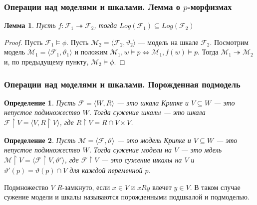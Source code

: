 \documentclass[pdf,utf8,russian,aspectratio=169]{beamer}
\newtheorem{defin}{Определение}
\newtheorem{lem}{Лемма}
\begin{document}
\begin{frame}
  \frametitle{Операции над моделями и шкалами. Лемма о $p$-морфизмах}

  \begin{lem}
    Пусть $f: \mathcal{F}_1 \twoheadrightarrow \mathcal{F}_2$, тогда $Log(\mathcal{F}_1) \subseteq Log(\mathcal{F}_2)$
  \end{lem}

  \begin{proof}
    Пусть $\mathcal{F}_1 \models \phi$. Пусть $\mathcal{M}_2 = \langle \mathcal{F}_2, \vartheta_2 \rangle$ --- модель на шкале
    $\mathcal{F}_2$. Посмотрим модель $\mathcal{M}_1 = \langle \mathcal{F}_1, \vartheta_1 \rangle$ и положим $\mathcal{M}_1, w
    \models p \Leftrightarrow \mathcal{M}_1, f(w) \models p$. Тогда $\mathcal{M}_1 \twoheadrightarrow \mathcal{M}_2$ и, по
    предыдущему пункту, $\mathcal{M}_2 \models \phi$.
  \end{proof}

\end{frame}

\begin{frame}
  \frametitle{Операции над моделями и шкалами. Порожденная подмодель}

  \begin{defin} Пусть $\mathcal{F} = \langle W, R \rangle$ --- это шкала Крипке и
  $V \subseteq W$ --- это непустое подмножество $W$. Тогда сужение шкалы --- это шкала
  $\mathcal{F} \upharpoonright V = \langle V, R \upharpoonright V \rangle$, где $R \upharpoonright V = R \cap V \times V$.

  \end{defin}

  \begin{defin}
    Пусть $\mathcal{M} = \langle \mathcal{F}, \vartheta \rangle$ --- это модель Крипке и $V \subseteq W$ --- это непустое подмножество $W$. Тогда сужение модели на $V$ --- это мдель $\mathcal{M} \upharpoonright V = \langle \mathcal{F} \upharpoonright V, \vartheta' \rangle$, где $\mathcal{F} \upharpoonright V$ --- это сужение шкалы на $V$ и $\vartheta'(p) = \vartheta(p) \cap V$ для каждой переменной $p$.
  \end{defin}

  Подмножество $V$ $R$-замкнуто, если $x \in V$ и $x R y$ влечет $y \in V$. В таком случае сужение модели и шкалы называются порожденными подшкалой и подмоделью.
\end{frame}
\end{document}
